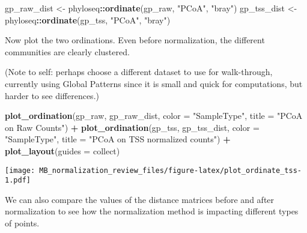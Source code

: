 \documentclass[
]{book}
\newenvironment{Shaded}{\begin{snugshade}}{\end{snugshade}}
\newcommand{\DataTypeTok}[1]{\textcolor[rgb]{0.13,0.29,0.53}{#1}}
\newcommand{\KeywordTok}[1]{\textcolor[rgb]{0.13,0.29,0.53}{\textbf{#1}}}
\newcommand{\NormalTok}[1]{#1}
\newcommand{\OperatorTok}[1]{\textcolor[rgb]{0.81,0.36,0.00}{\textbf{#1}}}
\newcommand{\StringTok}[1]{\textcolor[rgb]{0.31,0.60,0.02}{#1}}
\begin{document}
\begin{Shaded}
\begin{Highlighting}[]
\NormalTok{gp\_raw\_dist \textless{}{-}}\StringTok{ }\NormalTok{phyloseq}\OperatorTok{::}\KeywordTok{ordinate}\NormalTok{(gp\_raw, }\StringTok{"PCoA"}\NormalTok{, }\StringTok{"bray"}\NormalTok{)}
\NormalTok{gp\_tss\_dist \textless{}{-}}\StringTok{ }\NormalTok{phyloseq}\OperatorTok{::}\KeywordTok{ordinate}\NormalTok{(gp\_tss, }\StringTok{"PCoA"}\NormalTok{, }\StringTok{"bray"}\NormalTok{)}
\end{Highlighting}
\end{Shaded}

Now plot the two ordinations. Even before normalization, the different communities are clearly clustered.

(Note to self: perhaps choose a different dataset to use for walk-through, currently using Global Patterns since it is small and quick for computations, but harder to see differences.)

\begin{Shaded}
\begin{Highlighting}[]
\KeywordTok{plot\_ordination}\NormalTok{(gp\_raw, gp\_raw\_dist, }\DataTypeTok{color =} \StringTok{"SampleType"}\NormalTok{, }
                \DataTypeTok{title =} \StringTok{"PCoA on Raw Counts"}\NormalTok{) }\OperatorTok{+}\StringTok{ }
\KeywordTok{plot\_ordination}\NormalTok{(gp\_tss, gp\_tss\_dist, }\DataTypeTok{color =} \StringTok{"SampleType"}\NormalTok{, }
                \DataTypeTok{title =} \StringTok{"PCoA on TSS normalized counts"}\NormalTok{) }\OperatorTok{+}
\StringTok{  }\KeywordTok{plot\_layout}\NormalTok{(}\DataTypeTok{guides =} \StringTok{\textquotesingle{}collect\textquotesingle{}}\NormalTok{)}
\end{Highlighting}
\end{Shaded}

\texttt{[image: MB\_normalization\_review\_files/figure-latex/plot\_ordinate\_tss-1.pdf]}

We can also compare the values of the distance matrices before and after normalization to see how the normalization method is impacting different types of points.
\end{document}
